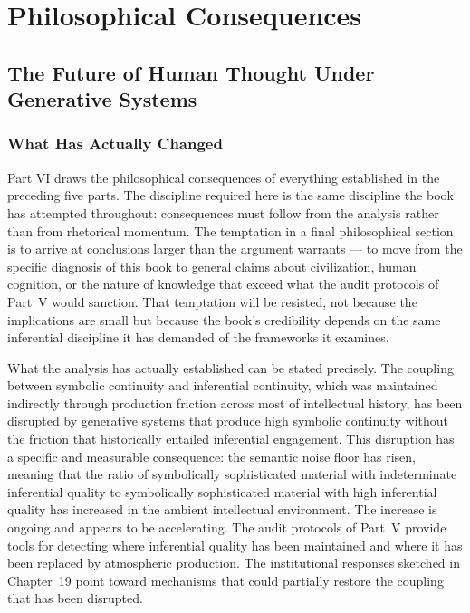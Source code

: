 \documentclass[12pt, openright, twoside]{book}
\begin{document}
\part{Philosophical Consequences}

\chapter{The Future of Human Thought Under Generative Systems}

\section{What Has Actually Changed}

Part VI draws the philosophical consequences of everything established in
the preceding five parts. The discipline required here is the same discipline
the book has attempted throughout: consequences must follow from the analysis
rather than from rhetorical momentum. The temptation in a final philosophical
section is to arrive at conclusions larger than the argument warrants ---
to move from the specific diagnosis of this book to general claims about
civilization, human cognition, or the nature of knowledge that exceed what
the audit protocols of Part~V would sanction. That temptation will be
resisted, not because the implications are small but because the book's
credibility depends on the same inferential discipline it has demanded of
the frameworks it examines.

What the analysis has actually established can be stated precisely. The
coupling between symbolic continuity and inferential continuity, which
was maintained indirectly through production friction across most of
intellectual history, has been disrupted by generative systems that
produce high symbolic continuity without the friction that historically
entailed inferential engagement. This disruption has a specific and
measurable consequence: the semantic noise floor has risen, meaning that
the ratio of symbolically sophisticated material with indeterminate
inferential quality to symbolically sophisticated material with high
inferential quality has increased in the ambient intellectual environment.
The increase is ongoing and appears to be accelerating. The audit protocols
of Part~V provide tools for detecting where inferential quality has been
maintained and where it has been replaced by atmospheric production. The
institutional responses sketched in Chapter~19 point toward mechanisms
that could partially restore the coupling that has been disrupted.
\end{document}

